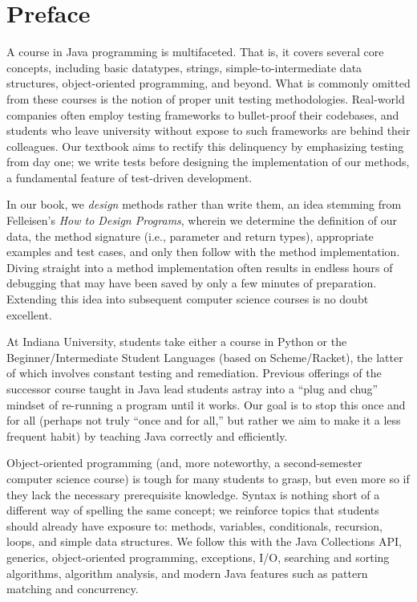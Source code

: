 \chapter*{Preface}

A course in Java programming is multifaceted. 
That is, it covers several core concepts, including basic datatypes, strings, simple-to-intermediate data structures, object-oriented programming, and beyond. 
What is commonly omitted from these courses is the notion of proper unit testing methodologies. 
Real-world companies often employ testing frameworks to bullet-proof their codebases, and students who leave university without expose to such frameworks are behind their colleagues. 
Our textbook aims to rectify this delinquency by emphasizing testing from day one; we write tests before designing the implementation of our methods, a fundamental feature of test-driven development.

In our book, we \emph{design} methods rather than write them, an idea stemming from Felleisen's \emph{How to Design Programs}, wherein we determine the definition of our data, the method signature (i.e., parameter and return types), appropriate examples and test cases, and only then follow with the method implementation. 
Diving straight into a method implementation often results in endless hours of debugging that may have been saved by only a few minutes of preparation. 
Extending this idea into subsequent computer science courses is no doubt excellent.

At Indiana University, students take either a course in Python or the Beginner/Intermediate Student Languages (based on Scheme/Racket), the latter of which involves constant testing and remediation. 
Previous offerings of the successor course taught in Java lead students astray into a ``plug and chug'' mindset of re-running a program until it works.
Our goal is to stop this once and for all (perhaps not truly ``once and for all,'' but rather we aim to make it a less frequent habit) by teaching Java correctly and efficiently. 

Object-oriented programming (and, more noteworthy, a second-semester computer science course) is tough for many students to grasp, but even more so if they lack the necessary prerequisite knowledge. 
Syntax is nothing short of a different way of spelling the same concept; we reinforce topics that students should already have exposure to: methods, variables, conditionals, recursion, loops, and simple data structures. 
We follow this with the Java Collections API, generics, object-oriented programming, exceptions, I/O, searching and sorting algorithms, algorithm analysis, and modern Java features such as pattern matching and concurrency. 

